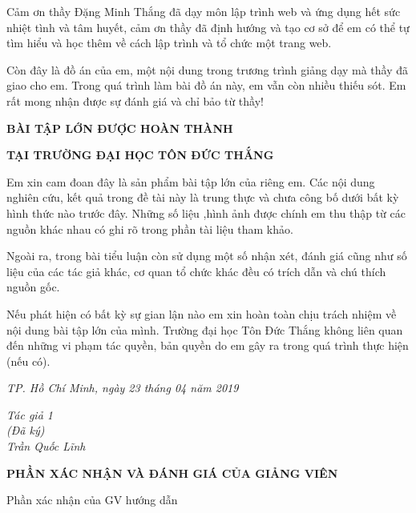 \documentclass{report}
\begin{document}
\changefontsizes{13pt}
\bigskip
\setlength{\parindent}{2cm}


Cảm ơn thầy Đặng Minh Thắng đã dạy môn lập trình web và ứng dụng hết sức nhiệt tình và tâm huyết, cảm ơn thầy đã định hướng và tạo cơ sở để em có thể tự tìm hiểu và học thêm về cách lập trình và tổ chức một trang web.

Còn đây là đồ án của em, một nội dung trong trương trình giảng dạy mà thầy đã giao cho em. Trong quá trình làm bài đồ án này, em vẫn còn nhiều thiếu sót. Em rất mong nhận được sự đánh giá và chỉ bảo từ thầy!
    
\newpage
\changefontsizes{16pt}
\centerline{\textbf{BÀI TẬP LỚN ĐƯỢC HOÀN THÀNH}}
\centerline{\textbf{TẠI TRƯỜNG ĐẠI HỌC TÔN ĐỨC THẮNG}}
\changefontsizes{13pt}
\vspace{1cm}
\setlength{\parindent}{2cm}
Em xin cam đoan đây là sản phẩm bài tập lớn của riêng em. Các nội dung nghiên cứu, kết quả trong đề tài này là trung thực và chưa công bố dưới bất kỳ hình thức nào trước đây. Những số liệu ,hình ảnh được chính em thu thập từ các nguồn khác nhau có ghi rõ trong phần tài liệu tham khảo.

\setlength{\parindent}{2cm}
Ngoài ra, trong bài tiểu luận còn sử dụng một số nhận xét, đánh giá cũng như số liệu của các tác giả khác, cơ quan tổ chức khác đều có trích dẫn và chú thích nguồn gốc.

\setlength{\parindent}{2cm}
Nếu phát hiện có bất kỳ sự gian lận nào em xin hoàn toàn chịu trách nhiệm về nội dung bài tập lớn của mình. Trường đại học Tôn Đức Thắng không liên quan đến những vi phạm tác quyền, bản quyền do em gây ra trong quá trình thực hiện (nếu có).

\vspace{0.75cm}
\begin{flushright}
\renewcommand{\baselinestretch}{0.05}
\changefontsizes{13pt}
\textit{TP. Hồ Chí Minh, ngày 23 tháng 04 năm 2019}
\end{flushright}

\setlength{\parindent}{12cm}
\textit{Tác giả 1}\\

\setlength{\parindent}{12cm}
\textit{(Đã ký)}\\

\setlength{\parindent}{11.25cm}
\textit{Trần Quốc Lĩnh}\\


\newpage
\changefontsizes{16pt}
\centerline{\textbf{PHẦN XÁC NHẬN VÀ ĐÁNH GIÁ CỦA GIẢNG VIÊN}}
\bigskip
\changefontsizes{13pt}
\setlength{\parindent}{2.2cm}
Phần xác nhận của GV hướng dẫn
\end{document}
